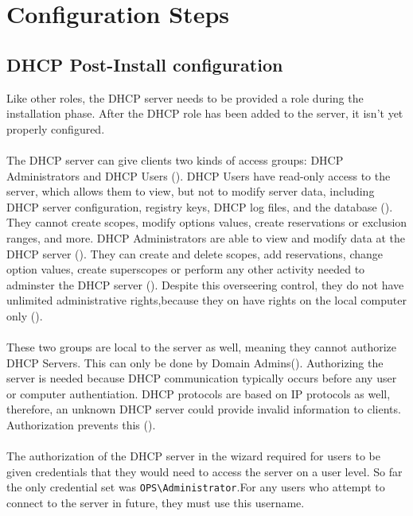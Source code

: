 \section{Configuration Steps}
\subsection{DHCP Post-Install configuration}
Like other roles, the DHCP server needs to be provided a role during the 
installation phase. After the DHCP role has been added to the server, 
it isn't yet properly configured. 

\paragraph{}
The DHCP server can give clients two kinds of access groups: DHCP Administrators and DHCP Users (\cite{DHCPgroups}).
DHCP Users have read-only access to the server, which allows them to view, but not to modify server data, including DHCP server 
configuration, registry keys, DHCP log files, and the database (\cite{DHCPgroups}). They cannot create scopes, modify options values, create 
reservations or exclusion ranges, and more.
DHCP Administrators are able to view and modify data at the DHCP server (\cite{DHCPgroups}). They can 
create and delete scopes, add reservations, change option values, create superscopes or perform
 any other activity needed to adminster the DHCP server (\cite{DHCPgroups}). Despite this overseering control, they do not 
have unlimited administrative rights,because they on have rights on the local computer only (\cite{DHCPgroups}). 

\paragraph{}
These two groups are local to the server as well, meaning they cannot authorize DHCP Servers. 
This can only be done by Domain Admins(\cite{DHCPgroups}). Authorizing the server is needed because DHCP communication typically occurs before any user
or computer authentiation. DHCP protocols are based on IP protocols as well, therefore, an unknown DHCP server could 
provide invalid information to clients. Authorization prevents this (\cite{DHCPauthor}).

\paragraph{}
The authorization of the DHCP server in the wizard required for users to be 
given credentials that they would need to access the server on a user level. So far the only 
credential set was \texttt{OPS\textbackslash{}Administrator}.For any users who attempt to 
connect to the server in future, they must use this username. 

